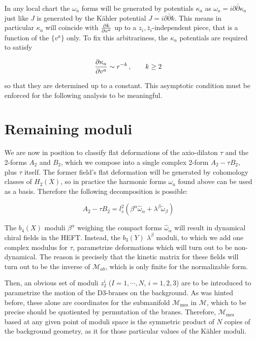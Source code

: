 In any local chart the $\omega_a$ forms will be generated by potentials $\kappa_a$ as ${\omega_a = i \partial \bar \partial \kappa_a}$ just like $J$ is generated by the K\"ahler potential $J = i \partial \bar \partial k$. This means in particular $\kappa_a$ will coincide with $\frac{\partial k}{\partial v^a}$ up to a $z_i, \bar z_i$-independent piece, that is a function of the $\{v^a\}$ only. To fix this arbitrariness, the $\kappa_a$ potentials are required to satisfy

\begin{equation}
	\frac{\partial\kappa_a}{\partial v^a} \sim r^{-k}\,, \quad \quad k \geq 2
	\label{asycond}
\end{equation}

so that they are determined up to a constant. This asymptotic condition must be enforced for the following analysis to be meaningful.

\section{Remaining moduli}\label{sec:hefttwo}

We are now in position to classify flat deformations of the axio-dilaton $\tau$ and the 2-forms $A_2$ and $B_2$, which we compose into a single complex 2-form $A_2 - \tau B_2$, plus $\tau$ itself. The former field's flat deformation will be generated by cohomology classes of $H_2(X)$, so in practice the harmonic forms $\omega_a$ found above can be used as a basis. Therefore the following decomposition is possible:

\begin{equation}
	A_2 - \tau B_2 = l_s^2 \left( \beta^\alpha \hat\omega_\alpha + \lambda^\beta \tilde \omega_\beta \right)
	\label{}
\end{equation}

The $b_4(X)$ moduli $\beta^\alpha$ weighing the compact forms $\hat\omega_\alpha$ will result in dynamical chiral fields in the HEFT. Instead, the $b_3(Y)$ $\lambda^\beta$ moduli, to which we add one complex modulus for $\tau$, parametrize deformations which will turn out to be non-dynamical. The reason is precisely that the kinetic matrix for these fields will turn out to be the inverse of $\mathcal{M}_{ab}$, which is only finite for the normalizable form.

Then, an obvious set of moduli $z_I^i$ ($I=1,\cdots,N$, $i = 1,2,3$) are to be introduced to parametrize the motion of the D3-branes on the background. As was hinted before, these alone are coordinates for the submanifold $\mathcal{M}_\text{mes}$ in $\mathcal{M}$, which to be precise should be quotiented by permutation of the branes. Therefore, $\mathcal{M}_\text{mes}$ based at any given point of moduli space is the symmetric product of $N$ copies of the background geometry, as it for those particular values of the K\"ahler moduli.

